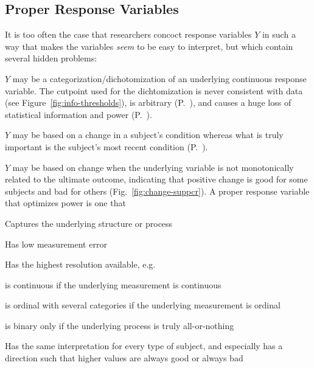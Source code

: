 \subsection{Proper Response Variables}\label{overview-yproper}
It is too often the case that researchers concoct response variables $Y$
in such a way that makes the variables \emph{seem} to be easy to
interpret, but which contain several hidden problems:
\bi
\item $Y$ may be a categorization/dichotomization of an underlying
  continuous response variable.  The cutpoint used for the
  dichtomization is never consistent with data (see
  Figure~\ref{fig:info-thresholds}), 
  is arbitrary (P.~\pageref{pg:info-gia14opt}), and causes a huge loss of
  statistical information and power (P.~\pageref{pg:info-fed09con}).
\item $Y$ may be based on a change in a subject's condition whereas
  what is truly important is the subject's most recent condition
  (P.~\pageref{pg:change-anova}).
\item $Y$ may be based on change when the underlying variable is not
  monotonically related to the ultimate outcome, indicating that
  positive change is good for some subjects and bad for others
  (Fig.~\ref{fig:change-suppcr}).
\ei
A proper response variable that optimizes power is one that
\bi
\item Captures the underlying structure or process
\item Has low measurement error
\item Has the highest resolution available, e.g.
 \bi
 \item is continuous if the underlying measurement is continuous
 \item is ordinal with several categories if the underlying
   measurement is ordinal
 \item is binary only if the underlying process is truly
   all-or-nothing
 \ei
\item Has the same interpretation for every type of subject, and
  especially has a direction such that higher values are always good
  or always bad
\ei

